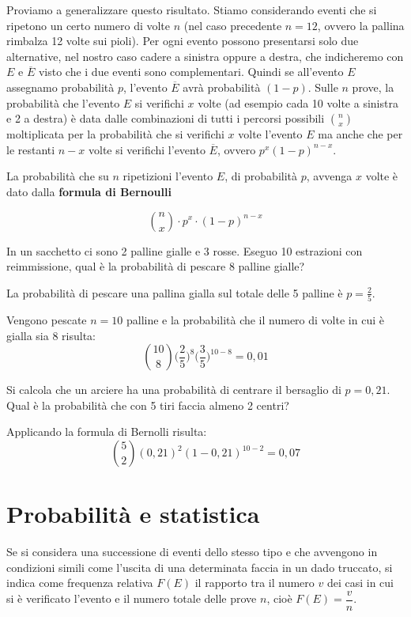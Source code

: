 Proviamo a generalizzare questo risultato. Stiamo considerando eventi che si 
ripetono un certo numero di volte $n$ (nel caso precedente $n=12$, ovvero la 
pallina rimbalza 12 volte sui pioli). Per ogni evento possono presentarsi 
solo due alternative, nel nostro caso cadere a sinistra oppure a destra, che 
indicheremo con $E$ e $\overline E$ visto che i due eventi sono complementari.
Quindi se all'evento $E$ assegnamo probabilità $p$, l'evento $\overline E$ 
avrà probabilità $(1-p)$.
Sulle $n$ prove, la probabilità che l'evento $E$ si verifichi $x$ volte (ad 
esempio cada 10 volte a sinistra e 2 a destra) è data dalle combinazioni di 
tutti i percorsi possibili $\binom{n}{x}$ moltiplicata per la probabilità che 
si verifichi $x$ volte l'evento $E$ ma anche che per le restanti $n-x$ volte 
si verifichi l'evento $\overline E$, ovvero $p^x(1-p)^{n-x}$.

\begin{definizione}
La probabilità che su $n$ ripetizioni l'evento $E$, di probabilità $p$, 
avvenga $x$ volte è dato dalla \textbf{formula di Bernoulli}

$$ \binom{n}{x}\cdot p^{x}\cdot(1-p)^{n-x}$$
\end{definizione}

\begin{esempio}
In un sacchetto ci sono 2 palline gialle e 3 rosse. Eseguo 10 estrazioni con 
reimmissione, qual è la probabilità di pescare 8 palline gialle?

La probabilità di pescare una pallina gialla sul totale delle 5 palline è 
$p=\frac{2}{5}$.

Vengono pescate $n=10$ palline e la probabilità che il numero di volte in cui 
è gialla sia 8 risulta:
$$ \binom{10}{8} \big(\frac{2}{5}\big)^{8}\big(\frac{3}{5}\big)^{10-8}=0,01$$

\end{esempio}

\begin{esempio}
Si calcola che un arciere ha una probabilità di centrare il bersaglio di 
$p=0,21$. Qual è la probabilità che con 5 tiri faccia almeno 2 centri?


Applicando la formula di Bernolli risulta:
$$ \binom{5}{2} (0,21)^{2}(1-0,21)^{10-2}=0,07$$

\end{esempio}


\section{Probabilità e statistica}
\label{sec:06_statistica}
Se si considera una successione di eventi dello stesso tipo e che avvengono 
in 
condizioni simili come l'uscita di una determinata faccia in un dado 
truccato, 
si indica come frequenza relativa $F(E)$ il rapporto tra il numero $v$ dei 
casi 
in cui si è verificato l'evento e il numero totale delle prove $n$, cioè 
$F(E)=\dfrac v n$.


